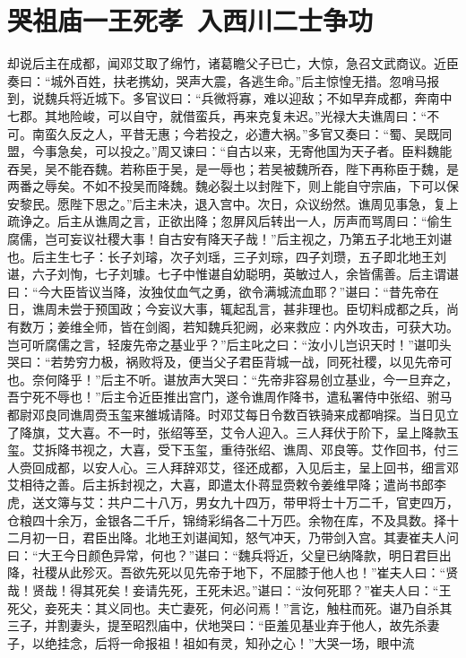 \chapter{哭祖庙一王死孝~入西川二士争功}

却说后主在成都，闻邓艾取了绵竹，诸葛瞻父子已亡，大惊，急召文武商议。近臣奏曰：“城外百姓，扶老携幼，哭声大震，各逃生命。”后主惊惶无措。忽哨马报到，说魏兵将近城下。多官议曰：“兵微将寡，难以迎敌；不如早弃成都，奔南中七郡。其地险峻，可以自守，就借蛮兵，再来克复未迟。”光禄大夫谯周曰：“不可。南蛮久反之人，平昔无惠；今若投之，必遭大祸。”多官又奏曰：“蜀、吴既同盟，今事急矣，可以投之。”周又谏曰：“自古以来，无寄他国为天子者。臣料魏能吞吴，吴不能吞魏。若称臣于吴，是一辱也；若吴被魏所吞，陛下再称臣于魏，是两番之辱矣。不如不投吴而降魏。魏必裂土以封陛下，则上能自守宗庙，下可以保安黎民。愿陛下思之。”后主未决，退入宫中。次日，众议纷然。谯周见事急，复上疏诤之。后主从谯周之言，正欲出降；忽屏风后转出一人，厉声而骂周曰：“偷生腐儒，岂可妄议社稷大事！自古安有降天子哉！”后主视之，乃第五子北地王刘谌也。后主生七子：长子刘璿，次子刘瑶，三子刘琮，四子刘瓒，五子即北地王刘谌，六子刘恂，七子刘璩。七子中惟谌自幼聪明，英敏过人，余皆儒善。后主谓谌曰：“今大臣皆议当降，汝独仗血气之勇，欲令满城流血耶？”谌曰：“昔先帝在日，谯周未尝于预国政；今妄议大事，辄起乱言，甚非理也。臣切料成都之兵，尚有数万；姜维全师，皆在剑阁，若知魏兵犯阙，必来救应：内外攻击，可获大功。岂可听腐儒之言，轻废先帝之基业乎？”后主叱之曰：“汝小儿岂识天时！”谌叩头哭曰：“若势穷力极，祸败将及，便当父子君臣背城一战，同死社稷，以见先帝可也。奈何降乎！”后主不听。谌放声大哭曰：“先帝非容易创立基业，今一旦弃之，吾宁死不辱也！”后主令近臣推出宫门，遂令谯周作降书，遣私署侍中张绍、驸马都尉邓良同谯周赍玉玺来雒城请降。时邓艾每日令数百铁骑来成都哨探。当日见立了降旗，艾大喜。不一时，张绍等至，艾令人迎入。三人拜伏于阶下，呈上降款玉玺。艾拆降书视之，大喜，受下玉玺，重待张绍、谯周、邓良等。艾作回书，付三人赍回成都，以安人心。三人拜辞邓艾，径还成都，入见后主，呈上回书，细言邓艾相待之善。后主拆封视之，大喜，即遣太仆蒋显赍敕令姜维早降；遣尚书郎李虎，送文簿与艾：共户二十八万，男女九十四万，带甲将士十万二千，官吏四万，仓粮四十余万，金银各二千斤，锦绮彩绢各二十万匹。余物在库，不及具数。择十二月初一日，君臣出降。北地王刘谌闻知，怒气冲天，乃带剑入宫。其妻崔夫人问曰：“大王今日颜色异常，何也？”谌曰：“魏兵将近，父皇已纳降款，明日君巨出降，社稷从此殄灭。吾欲先死以见先帝于地下，不屈膝于他人也！”崔夫人曰：“贤哉！贤哉！得其死矣！妾请先死，王死未迟。”谌曰：“汝何死耶？”崔夫人曰：“王死父，妾死夫：其义同也。夫亡妻死，何必问焉！”言讫，触柱而死。谌乃自杀其三子，并割妻头，提至昭烈庙中，伏地哭曰：“臣羞见基业弃于他人，故先杀妻子，以绝挂念，后将一命报祖！祖如有灵，知孙之心！”大哭一场，眼中流

